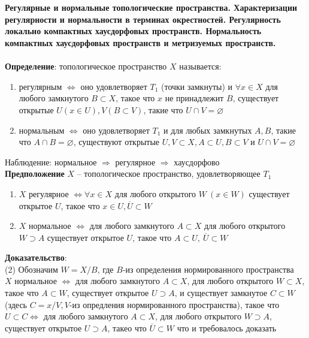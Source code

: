 \section{}
	\textbf{Регулярные и нормальные топологические пространства. Характеризации регулярности и нормальности в терминах окрестностей. Регулярность локально компактных хаусдорфовых пространств. Нормальность компактных хаусдорфовых пространств и метризуемых пространств.}\\
	\\
	\textbf{Определение}: топологическое пространство $X$ называется:\\
	\begin{enumerate}
		\item 
		регулярным $\Leftrightarrow$ оно удовлетворяет $T_1$ (точки замкнуты) и $\forall x\in X$ для любого замкнутого $B \subset X$, такое что $x$ не принадлежит $B$, существует открытые $U(x\in U),V (B\subset V)$, такие что $U\cap V=\varnothing$
		\item 
		нормальным $\Leftrightarrow$ оно удовлетворяет $T_1$ и для любых замкнутых $A, B$, такие что $A \cap B=\varnothing$, существуют открытые $U, V\subset X, A\subset U, B\subset V$ и $U\cap V=\varnothing$
	\end{enumerate}
	Наблюдение: нормальное $\Rightarrow$ регулярное $\Rightarrow$ хаусдорфово\\
	\textbf{Предположение} $X$ -- топологическое  пространство, удовлетворяющее $T_1$\\
	\begin{enumerate}
		\item 
		$X$ регулярное $\Leftrightarrow \forall x\in X$ для любого открытого $W\ (x\in W)$ существует открытое $U$, такое что $x\in U, \overline{U} \subset W$
		\item 
		$X$ нормальное $\Leftrightarrow$ для любого замкнутого $A\subset X$ для любого открытого $W\supset A$ существует открытое $U$, такое что $A\subset U,\ \overline{U}\subset W$
	\end{enumerate}
	\textbf{Доказательство}: \\
	(2) Обозначим $W=X\slash B$, где $B$-из определения нормированного пространства\\
	$X$ нормальное $\Leftrightarrow$ для любого замкнутого $A \subset X$, для любого открытого $W\subset X$, такое что $A\subset W$, существует открытое $U\supset A$, и существует замкнутое $C\subset W$(здесь $C=x\slash V, V$-из опредления нормированного пространства), такое что $U\subset C \Leftrightarrow$ для любого замкнутого $A\subset X$, для любого открытого $W\supset A$, существует открытое $U \supset A$, такео что $\overline{U}\subset W$ что и требовалось доказать\\
